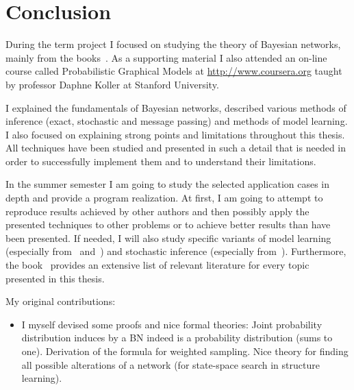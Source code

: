 \documentclass[english,cover]{fitthesis} %
\newcommand{\todo}[1]{{\color{red}#1}}
\begin{document}

\chapter{Conclusion}
During the term project I focused on studying the theory of Bayesian networks, mainly from the books~\cite{pgm,russell_norvig_ed2}. As a supporting material I also attended an on-line course called Probabilistic Graphical Models at \url{http://www.coursera.org} taught by professor Daphne Koller at Stanford University.

I explained the fundamentals of Bayesian networks, described various methods of inference (exact, stochastic and message passing) and methods of model learning. I also focused on explaining strong points and limitations throughout this thesis. All techniques have been studied and presented in such a detail that is needed in order to successfully implement them and to understand their limitations.

\medskip

In the summer semester I am going to study the selected application cases in depth and provide a program realization. At first, I am going to attempt to reproduce results achieved by other authors and then possibly apply the presented techniques to other problems or to achieve better results than have been presented. If needed, I will also study specific variants of model learning (especially from~\cite{heckerman96} and~\cite{buntine94}) and stochastic inference (especially from~\cite{neal93}). Furthermore, the book~\cite{pgm} provides an extensive list of relevant literature for every topic presented in this thesis. %

My original contributions:
\begin{itemize}
	\item I myself devised some proofs and nice formal theories: Joint probability distribution induces by a BN indeed is a probability distribution (sums to one). Derivation of the formula for weighted sampling. Nice theory for finding all possible alterations of a network (for state-space search in structure learning).
\end{itemize}
\end{document}
